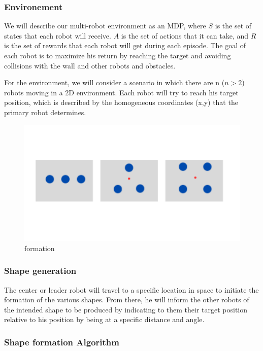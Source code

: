 \documentclass[12pt]{extarticle}
\begin{document}
\subsubsection{Environement}

We will describe our multi-robot environment as an MDP, where $S$ is the set of states that each robot will receive. $A$ is the set of actions that it can take, and $R$ is the set of rewards that each robot will get during each episode. The goal of each robot is to maximize his return by reaching the target and avoiding collisions with the wall and other robots and obstacles. 

For the environment, we will consider a scenario in which there are n ($n > 2$) robots moving in a 2D environment. Each robot will try to reach his target position, which is described by the homogeneous coordinates (x,y) that the primary robot determines.


 
 \begin{figure}[h]  
\centering
\includegraphics[scale=0.4]{formation}
\caption[formation]{formation}
\end{figure}

\pagebreak
\subsubsection{Shape generation}
The center or leader robot will travel to a specific location in space to initiate the formation of the various shapes. From there, he will inform the other robots of the intended shape to be produced by indicating to them their target position relative to his position by being at a specific distance and angle.


\subsubsection{Shape formation Algorithm}
\end{document}
